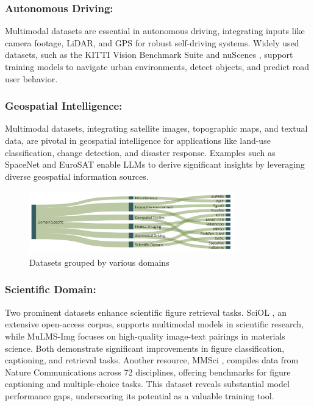 \documentclass[runningheads]{llncs}
\begin{document}
\subsubsection{Autonomous Driving:}
Multimodal datasets are essential in autonomous driving, integrating inputs like camera footage, LiDAR, and GPS for robust self-driving systems. Widely used datasets, such as the KITTI Vision Benchmark Suite \cite{ref100} and nuScenes \cite{ref101}, support training models to navigate urban environments, detect objects, and predict road user behavior.



\subsubsection{Geospatial Intelligence:}
Multimodal datasets, integrating satellite images, topographic maps, and textual data, are pivotal in geospatial intelligence for applications like land-use classification, change detection, and disaster response\cite{ref58}. Examples such as SpaceNet \cite{ref102} and EuroSAT \cite{ref103} enable LLMs to derive significant insights by leveraging diverse geospatial information sources.

    \begin{figure}[h!]
    	\centering
    	\includegraphics[width=0.8\textwidth]{domain_split.png} %
    	\caption{Datasets grouped by various domains}
    	\label{fig:domain_split}
        \vspace{-1em}
    \end{figure}
    
\subsubsection{Scientific Domain:}
Two prominent datasets enhance scientific figure retrieval tasks. SciOL \cite{ref75}, an extensive open-access corpus, supports multimodal models in scientific research, while MuLMS-Img \cite{ref75} focuses on high-quality image-text pairings in materials science. Both demonstrate significant improvements in figure classification, captioning, and retrieval tasks. Another resource, MMSci \cite{ref77}, compiles data from Nature Communications across 72 disciplines, offering benchmarks for figure captioning and multiple-choice tasks. This dataset reveals substantial model performance gaps, underscoring its potential as a valuable training tool.
\end{document}
